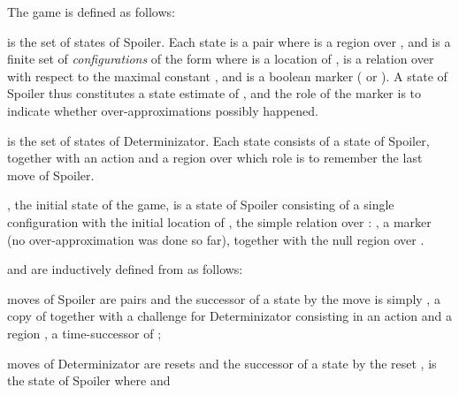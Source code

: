 \documentclass{LMCS}
\theoremstyle{plain}\newtheorem{proposition}[thm]{Proposition}
\begin{document}
The game 
is defined as follows: 
\begin{iteMize}{}
\item  is the set of states of Spoiler.  Each state
  is a pair  where  is a region over
  , and  is a finite set of \emph{configurations}
  of the form  where  is a location of ,  is
  a relation over  with respect to the maximal
  constant , and  is a boolean marker ( or
  ).  A state of Spoiler thus constitutes a state estimate of
  , and the role of the marker  is to indicate whether
  over-approximations possibly happened.
\item  is the
  set of states of Determinizator. Each state 
  consists of a state of Spoiler, together with an action and a region
  over  which role is to remember the last move of Spoiler.
\item , the
  initial state of the game, is a state of Spoiler consisting of a
  single configuration with
the initial location  of , the simple relation 
over : , a marker  (no over-approximation was done so far),
together with the null region over .
\item  and  are inductively defined from  as follows:
\begin{iteMize}{}
\item moves of Spoiler are pairs  and the successor of a
  state  by the move  is simply
  , \ie a copy of  together with a
  challenge for Determinizator consisting in an action  and a
  region , a time-successor of ;
\item moves of Determinizator are resets  and
  the successor of a state  by the
  reset , is the state of Spoiler
   where  and


\end{iteMize}
\end{iteMize}
\end{document}
